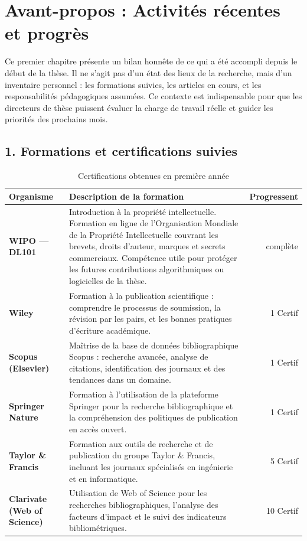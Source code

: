 \documentclass[12pt, a4paper]{report}
\begin{document}
\chapter*{Avant-propos : Activités récentes et progrès}

Ce premier chapitre présente un bilan honnête de ce qui a été accompli depuis le début de
la thèse. Il ne s'agit pas d'un état des lieux de la recherche, mais d'un inventaire personnel :
les formations suivies, les articles en cours, et les responsabilités pédagogiques assumées.
Ce contexte est indispensable pour que les directeurs de thèse puissent évaluer la charge
de travail réelle et guider les priorités des prochains mois.

\section*{1. Formations et certifications suivies}

\begin{table}[h!]
\centering
\caption{Certifications obtenues en première année}
\label{tab:certifications}
\renewcommand{\arraystretch}{1.4}
\begin{tabularx}{\textwidth}{>{\bfseries}lXr}
\toprule
Organisme & Description de la formation & Progressent\\
\midrule
WIPO — DL101 & Introduction à la propriété intellectuelle. Formation en ligne de l'Organisation
Mondiale de la Propriété Intellectuelle couvrant les brevets, droits d'auteur, marques
et secrets commerciaux. Compétence utile pour protéger les futures contributions
algorithmiques ou logicielles de la thèse. & complète \\[4pt]
Wiley & Formation à la publication scientifique : comprendre le processus de soumission,
la révision par les pairs, et les bonnes pratiques d'écriture académique. & 1 Certif \\[4pt]
Scopus (Elsevier) & Maîtrise de la base de données bibliographique Scopus : recherche
avancée, analyse de citations, identification des journaux et des tendances dans un
domaine. &  1 Certif \\[4pt]
Springer Nature & Formation à l'utilisation de la plateforme Springer pour la recherche
bibliographique et la compréhension des politiques de publication en accès ouvert. & 1 Certif \\[4pt]
Taylor \& Francis & Formation aux outils de recherche et de publication du groupe
Taylor \& Francis, incluant les journaux spécialisés en ingénierie et en informatique. & 5 Certif \\[4pt]
Clarivate (Web of Science) & Utilisation de Web of Science pour les recherches bibliographiques,
l'analyse des facteurs d'impact et le suivi des indicateurs bibliométriques. & 10 Certif \\
\bottomrule
\end{tabularx}
\end{table}
\end{document}
